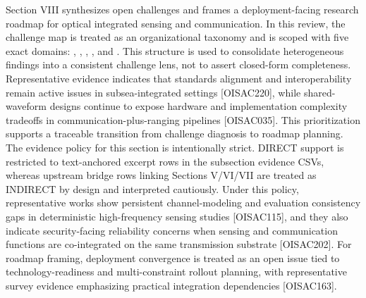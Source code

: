 {}Section VIII synthesizes open challenges and frames a deployment-facing research roadmap for optical integrated sensing and communication. In this review, the challenge map is treated as an organizational taxonomy and is scoped with five exact domains: , , , , and . This structure is used to consolidate heterogeneous findings into a consistent challenge lens, not to assert closed-form completeness. Representative evidence indicates that standards alignment and interoperability remain active issues in subsea-integrated settings [O\markdownRendererUnderscore{}ISAC\markdownRendererUnderscore{}220], while shared-waveform designs continue to expose hardware and implementation complexity tradeoffs in communication-plus-ranging pipelines [O\markdownRendererUnderscore{}ISAC\markdownRendererUnderscore{}035]. This prioritization supports a traceable transition from challenge diagnosis to roadmap planning.\markdownRendererParagraphSeparator
{}The evidence policy for this section is intentionally strict. DIRECT support is restricted to text-anchored excerpt rows in the subsection evidence CSVs, whereas upstream bridge rows linking Sections V/VI/VII are treated as INDIRECT by design and interpreted cautiously. Under this policy, representative works show persistent channel-modeling and evaluation consistency gaps in deterministic high-frequency sensing studies [O\markdownRendererUnderscore{}ISAC\markdownRendererUnderscore{}115], and they also indicate security-facing reliability concerns when sensing and communication functions are co-integrated on the same transmission substrate [O\markdownRendererUnderscore{}ISAC\markdownRendererUnderscore{}202]. For roadmap framing, deployment convergence is treated as an open issue tied to technology-readiness and multi-constraint rollout planning, with representative survey evidence emphasizing practical integration dependencies [O\markdownRendererUnderscore{}ISAC\markdownRendererUnderscore{}163].\markdownRendererParagraphSeparator
